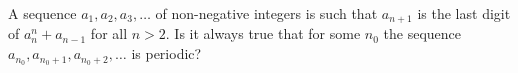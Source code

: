 A sequence $a_1,a_2,a_3,\ldots $ of non-negative integers is such that $a_{n+1}$ is the last digit of $a_n^n+a_{n-1}$ for all $n>2$. Is it always true that for some $n_0$ the sequence $a_{n_0},a_{n_0+1},a_{n_0+2},\ldots$ is periodic?